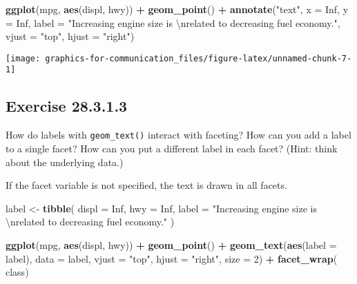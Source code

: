 \documentclass[]{book}
\newenvironment{Shaded}{\begin{snugshade}}{\end{snugshade}}
\newcommand{\CharTok}[1]{\textcolor[rgb]{0.31,0.60,0.02}{#1}}
\newcommand{\DataTypeTok}[1]{\textcolor[rgb]{0.13,0.29,0.53}{#1}}
\newcommand{\DecValTok}[1]{\textcolor[rgb]{0.00,0.00,0.81}{#1}}
\newcommand{\KeywordTok}[1]{\textcolor[rgb]{0.13,0.29,0.53}{\textbf{#1}}}
\newcommand{\NormalTok}[1]{#1}
\newcommand{\OperatorTok}[1]{\textcolor[rgb]{0.81,0.36,0.00}{\textbf{#1}}}
\newcommand{\OtherTok}[1]{\textcolor[rgb]{0.56,0.35,0.01}{#1}}
\newcommand{\StringTok}[1]{\textcolor[rgb]{0.31,0.60,0.02}{#1}}
\theoremstyle{plain}
\theoremstyle{remark}
\begin{document}
\begin{Shaded}
\begin{Highlighting}[]
\KeywordTok{ggplot}\NormalTok{(mpg, }\KeywordTok{aes}\NormalTok{(displ, hwy)) }\OperatorTok{+}
\StringTok{  }\KeywordTok{geom_point}\NormalTok{() }\OperatorTok{+}
\StringTok{  }\KeywordTok{annotate}\NormalTok{(}\StringTok{"text"}\NormalTok{, }\DataTypeTok{x =} \OtherTok{Inf}\NormalTok{, }\DataTypeTok{y =} \OtherTok{Inf}\NormalTok{,}
           \DataTypeTok{label =} \StringTok{"Increasing engine size is }\CharTok{\textbackslash{}n}\StringTok{related to decreasing fuel economy."}\NormalTok{, }\DataTypeTok{vjust =} \StringTok{"top"}\NormalTok{, }\DataTypeTok{hjust =} \StringTok{"right"}\NormalTok{)}
\end{Highlighting}
\end{Shaded}

\begin{center}\texttt{[image: graphics-for-communication\_files/figure-latex/unnamed-chunk-7-1]} \end{center}

\hypertarget{exercise-28.3.1.3}{%
\subsection*{\texorpdfstring{Exercise
{28.3.1.3}}{Exercise 28.3.1.3}}\label{exercise-28.3.1.3}}

How do labels with \texttt{geom\_text()} interact with faceting? How can
you add a label to a single facet? How can you put a different label in
each facet? (Hint: think about the underlying data.)

If the facet variable is not specified, the text is drawn in all facets.

\begin{Shaded}
\begin{Highlighting}[]
\NormalTok{label <-}\StringTok{ }\KeywordTok{tibble}\NormalTok{(}
  \DataTypeTok{displ =} \OtherTok{Inf}\NormalTok{,}
  \DataTypeTok{hwy =} \OtherTok{Inf}\NormalTok{,}
  \DataTypeTok{label =} \StringTok{"Increasing engine size is }\CharTok{\textbackslash{}n}\StringTok{related to decreasing fuel economy."}
\NormalTok{)}

\KeywordTok{ggplot}\NormalTok{(mpg, }\KeywordTok{aes}\NormalTok{(displ, hwy)) }\OperatorTok{+}
\StringTok{  }\KeywordTok{geom_point}\NormalTok{() }\OperatorTok{+}
\StringTok{  }\KeywordTok{geom_text}\NormalTok{(}\KeywordTok{aes}\NormalTok{(}\DataTypeTok{label =}\NormalTok{ label), }\DataTypeTok{data =}\NormalTok{ label, }\DataTypeTok{vjust =} \StringTok{"top"}\NormalTok{, }\DataTypeTok{hjust =} \StringTok{"right"}\NormalTok{,}
            \DataTypeTok{size =} \DecValTok{2}\NormalTok{) }\OperatorTok{+}
\StringTok{  }\KeywordTok{facet_wrap}\NormalTok{(}\OperatorTok{~}\StringTok{ }\NormalTok{class)}
\end{Highlighting}
\end{Shaded}
\end{document}
